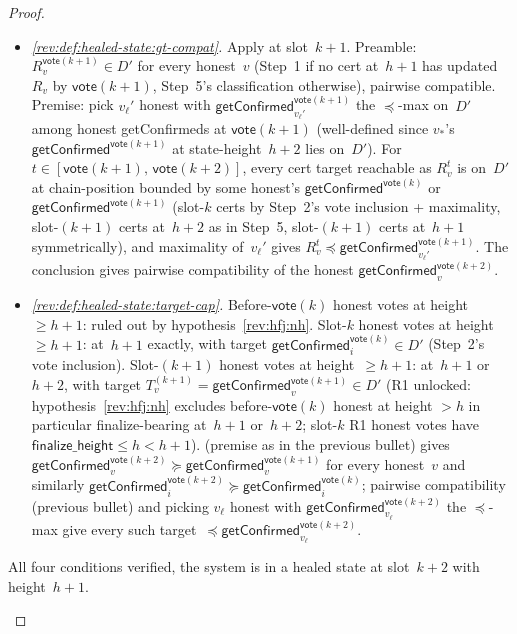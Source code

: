 \ifx\litemode\undefined\documentclass{article}\fi
\newcommand{\finalizeHeight}{\mathsf{finalize\_height}}
\newcommand{\vote}{\mathsf{vote}}
\newcommand{\getConfirmed}{\textsf{getConfirmed}\xspace}
\theoremstyle{plain}
\theoremstyle{definition}
\theoremstyle{remark}
\begin{document}
\begin{proof}
\begin{description}
\begin{description}
\begin{itemize}
  \item \emph{\ref{rev:def:healed-state:gt-compat}.}
  Apply  at slot~$k+1$. Preamble: $R_v^{\vote(k+1)} \in D'$ for every honest~$v$ (Step~1 if no cert at~$h+1$ has updated~$R_v$ by $\vote(k+1)$, Step~5's classification otherwise), pairwise compatible. Premise: pick $v_\ell'$ honest with $\getConfirmed_{v_\ell'}^{\vote(k+1)}$ the $\preceq$-max on~$D'$ among honest \getConfirmed{}s at $\vote(k+1)$ (well-defined since $v_*$'s $\getConfirmed^{\vote(k+1)}$ at state-height~$h+2$ lies on~$D'$). For $t \in [\vote(k+1),\, \vote(k+2)]$, every cert target reachable as $R_v^t$ is on~$D'$ at chain-position bounded by some honest's $\getConfirmed^{\vote(k)}$ or $\getConfirmed^{\vote(k+1)}$ (slot-$k$ certs by Step~2's vote inclusion + maximality, slot-$(k+1)$ certs at~$h+2$ as in Step~5, slot-$(k+1)$ certs at~$h+1$ symmetrically), and maximality of~$v_\ell'$ gives $R_v^t \preceq \getConfirmed_{v_\ell'}^{\vote(k+1)}$. The conclusion gives pairwise compatibility of the honest $\getConfirmed_v^{\vote(k+2)}$.

  \item \emph{\ref{rev:def:healed-state:target-cap}.}
  Before-$\vote(k)$ honest votes at height~$\geq h+1$: ruled out by hypothesis~\ref{rev:hfj:nh}. Slot-$k$ honest votes at height~$\geq h+1$: at~$h+1$ exactly, with target $\getConfirmed_i^{\vote(k)} \in D'$ (Step~2's vote inclusion). Slot-$(k+1)$ honest votes at height~$\geq h+1$: at~$h+1$ or~$h+2$, with target $T_v^{(k+1)} = \getConfirmed_v^{\vote(k+1)} \in D'$ (R1 unlocked: hypothesis~\ref{rev:hfj:nh} excludes before-$\vote(k)$ honest at height $>h$ in particular finalize-bearing at~$h+1$ or~$h+2$; slot-$k$ R1 honest votes have $\finalizeHeight \leq h < h+1$).  (premise as in the previous bullet) gives $\getConfirmed_v^{\vote(k+2)} \succeq \getConfirmed_v^{\vote(k+1)}$ for every honest~$v$ and similarly $\getConfirmed_i^{\vote(k+2)} \succeq \getConfirmed_i^{\vote(k)}$; pairwise compatibility (previous bullet) and picking $v_\ell$ honest with $\getConfirmed_{v_\ell}^{\vote(k+2)}$ the $\preceq$-max give every such target~$\preceq \getConfirmed_{v_\ell}^{\vote(k+2)}$.
\end{itemize}
All four conditions verified, the system is in a healed state at slot~$k+2$ with height~$h+1$.
\end{description}
\end{description}
\end{proof}
\end{document}
